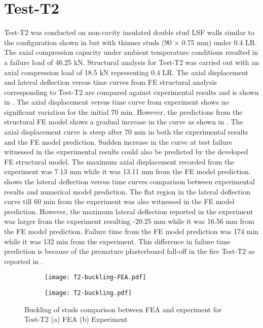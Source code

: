 \section*{Test-T2}

Test-T2 was conducted on non-cavity insulated double stud LSF walls similar to the configuration shown in  but with thinner studs (90 $\times$ 0.75 mm) under 0.4 LR. The axial compression capacity under ambient temperature conditions resulted in a failure load of 46.25 kN. Structural analysis for Test-T2 was carried out with an axial compression load of 18.5 kN representing 0.4 LR. The axial displacement and lateral deflection versus time curves from FE structural analysis corresponding to Test-T2 are compared against experimental results and is shown in . The axial displacement versus time curve from experiment shows no significant variation for the initial 70 min. However, the predictions from the structural FE model shows a gradual increase in the curve as shown in . The axial displacement curve is steep after 70 min in both the experimental results and the FE model prediction. Sudden increase in the curve at test failure witnessed in the experimental results could also be predicted by the developed FE structural model. The maximum axial displacement recorded from the experiment was 7.13 mm while it was 13.11 mm from the FE model prediction.  shows the lateral deflection versus time curves comparison between experimental results and numerical model prediction. The flat region in the lateral deflection curve till 60 min from the experiment was also witnessed in the FE model prediction. However, the maximum lateral deflection reported in the experiment was larger from the experiment resulting -20.25 mm while it was 16.56 mm from the FE model prediction. Failure time from the FE model prediction was 174 min while it was 132 min from the experiment. This difference in failure time prediction is because of the premature plasterboard fall-off in the fire Test-T2 as reported in .        
\begin{figure}[!htbp]
	\centering
	\begin{subfigure}[b]{0.8\textwidth}
		\centering
		\texttt{[image: T2-buckling-FEA.pdf]}
		\caption{}
		\label{subfig:T2-buckling-FEA}
	\end{subfigure}
	\begin{subfigure}[b]{0.3\textwidth}
		\centering
		\texttt{[image: T2-buckling.pdf]}
		\caption{}
		\label{subfig:T2-buckling-FEA-Exp}
	\end{subfigure}
	   \caption{Buckling of studs comparison between FEA and experiment for Test-T2 (a) FEA (b) Experiment}
	   \label{fig:T2-buckling-FE-vs-Exp}
\end{figure} 
